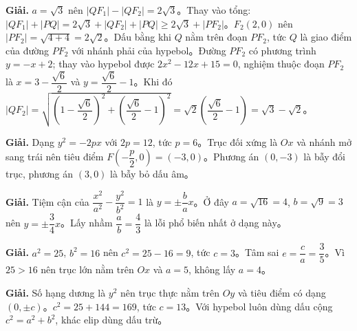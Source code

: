 \documentclass[11pt, a4paper]{article}
\begin{document}
\vspace{0.3cm}
\begin{dapan}[16 — Đáp án B]

\textbf{Giải.} $a=\sqrt{3}$ nên $\lvert QF_1\rvert-\lvert QF_2\rvert=2\sqrt{3}$。Thay vào tổng: $\lvert QF_1\rvert+\lvert PQ\rvert=2\sqrt{3}+\lvert QF_2\rvert+\lvert PQ\rvert\ge2\sqrt{3}+\lvert PF_2\rvert$。$F_2(2,0)$ nên $\lvert PF_2\rvert=\sqrt{4+4}=2\sqrt{2}$。Dấu bằng khi $Q$ nằm trên đoạn $PF_2$, tức $Q$ là giao điểm của đường $PF_2$ với nhánh phải của hypebol。Đường $PF_2$ có phương trình $y=-x+2$; thay vào hypebol được $2x^2-12x+15=0$, nghiệm thuộc đoạn $PF_2$ là $x=3-\dfrac{\sqrt{6}}{2}$ và $y=\dfrac{\sqrt{6}}{2}-1$。Khi đó $\lvert QF_2\rvert=\sqrt{\left(1-\dfrac{\sqrt{6}}{2}\right)^2+\left(\dfrac{\sqrt{6}}{2}-1\right)^2}=\sqrt{2}\left(\dfrac{\sqrt{6}}{2}-1\right)=\sqrt{3}-\sqrt{2}$。


\end{dapan}
\vspace{0.3cm}
\begin{dapan}[17 — Đáp án D]

\textbf{Giải.} Dạng $y^2=-2px$ với $2p=12$, tức $p=6$。Trục đối xứng là $Ox$ và nhánh mở sang trái nên tiêu điểm $F\left(-\dfrac{p}{2},0\right)=(-3,0)$。Phương án $(0,-3)$ là bẫy đổi trục, phương án $(3,0)$ là bẫy bỏ dấu âm。


\end{dapan}
\vspace{0.3cm}
\begin{dapan}[18 — Đáp án C]

\textbf{Giải.} Tiệm cận của $\dfrac{x^2}{a^2}-\dfrac{y^2}{b^2}=1$ là $y=\pm\dfrac{b}{a}x$。Ở đây $a=\sqrt{16}=4$, $b=\sqrt{9}=3$ nên $y=\pm\dfrac{3}{4}x$。Lấy nhầm $\dfrac{a}{b}=\dfrac{4}{3}$ là lỗi phổ biến nhất ở dạng này。


\end{dapan}
\vspace{0.3cm}
\begin{dapan}[19 — Đáp án A]

\textbf{Giải.} $a^2=25$, $b^2=16$ nên $c^2=25-16=9$, tức $c=3$。Tâm sai $e=\dfrac{c}{a}=\dfrac{3}{5}$。Vì $25>16$ nên trục lớn nằm trên $Ox$ và $a=5$, không lấy $a=4$。


\end{dapan}
\vspace{0.3cm}
\begin{dapan}[20 — Đáp án D]

\textbf{Giải.} Số hạng dương là $y^2$ nên trục thực nằm trên $Oy$ và tiêu điểm có dạng $(0,\pm c)$。$c^2=25+144=169$, tức $c=13$。Với hypebol luôn dùng dấu cộng $c^2=a^2+b^2$, khác elip dùng dấu trừ。


\end{dapan}
\end{document}
